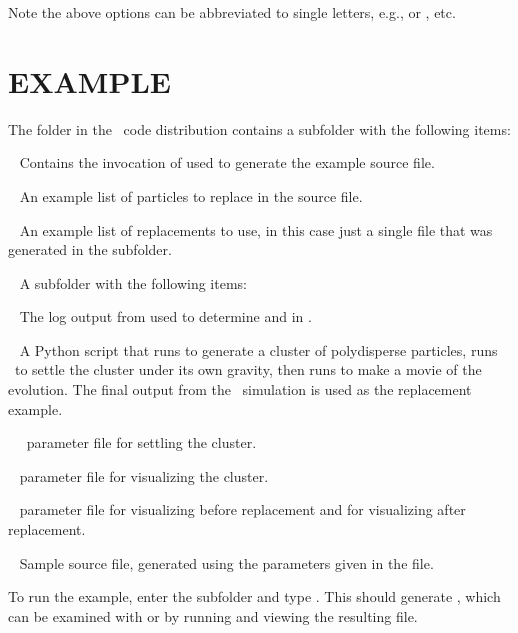 Note the above options can be abbreviated to single letters, e.g.,
 or {}, etc.

\section{EXAMPLE}

The  folder in the \pkd\ code distribution contains a
subfolder  with the following items:
\begin{description}
\item{} ~ Contains the invocation of  used to
  generate the example source file.
\item{} ~ An example list of particles to replace
  in the source file.
\item{} ~ An example list of replacements to
  use, in this case just a single  file that was generated in
  the  subfolder.
\item{} ~ A subfolder with the following items:
  \begin{description}
    \item{} ~ The log output from 
      used to determine  and  in .
    \item{} ~ A Python script that runs 
      to generate a cluster of polydisperse particles, runs \pkd\ to
      settle the cluster under its own gravity, then runs
       to make a movie of the evolution.  The final
      output from the \pkd\ simulation is used as the replacement
      example.
    \item{} ~ \pkd\ parameter file for settling the
      cluster.
    \item{} ~  parameter file for
      visualizing the cluster.
  \end{description}
\item{} ~  parameter file for
  visualizing  before replacement and for visualizing
   after replacement.
\item{} ~ Sample source  file, generated using
  the parameters given in the  file.
\end{description}

To run the example, enter the  subfolder and type
.  This should generate
, which can be examined with  or by
running  and viewing the resulting
 file.

